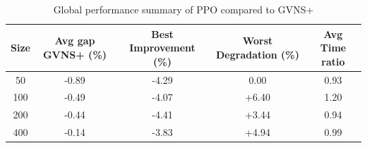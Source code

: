 \begin{table}[ht]
\centering
\small
\setlength{\tabcolsep}{8pt}
\caption{Global performance summary of PPO compared to GVNS+}
\vspace{3mm}
\begin{tabular}{c c c c c}
\toprule
\textbf{Size} & \textbf{Avg gap GVNS+ (\%)} & \textbf{Best Improvement (\%)} & \textbf{Worst Degradation (\%)} & \textbf{Avg Time ratio} \\
\midrule
50  & -0.89 & -4.29 & 0.00 & 0.93 \\
100 & -0.49 & -4.07 & +6.40 & 1.20 \\
200 & -0.44 & -4.41 & +3.44 & 0.94 \\
400 & -0.14 & -3.83 & +4.94 & 0.99 \\
\bottomrule
\end{tabular}
\label{tab:ppo_summary}
\end{table}